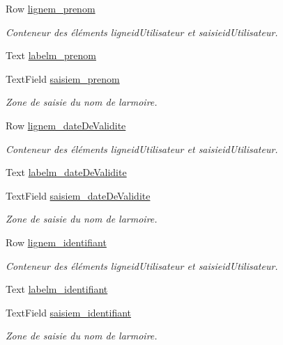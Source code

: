 \begin{DoxyCompactItemize}
Row \hyperlink{class_modification_utilisateur_a68a0801b7ac7ed932bb301a4649acb57}{lignem\+\_\+prenom}
\begin{DoxyCompactList}\small\item\em Conteneur des éléments ligneid\+Utilisateur et saisieid\+Utilisateur. \end{DoxyCompactList}\item 
Text \hyperlink{class_modification_utilisateur_a07c14435b6fc56bc5d724418d47ad8aa}{labelm\+\_\+prenom}
\item 
Text\+Field \hyperlink{class_modification_utilisateur_ae5fd8aa697fddc1b7c5a319d9ac78dfb}{saisiem\+\_\+prenom}
\begin{DoxyCompactList}\small\item\em Zone de saisie du nom de l\textquotesingle{}armoire. \end{DoxyCompactList}\item 
Row \hyperlink{class_modification_utilisateur_abbb480bff5baa6584137c48f1d8a8919}{lignem\+\_\+date\+De\+Validite}
\begin{DoxyCompactList}\small\item\em Conteneur des éléments ligneid\+Utilisateur et saisieid\+Utilisateur. \end{DoxyCompactList}\item 
Text \hyperlink{class_modification_utilisateur_a19c1b9dc4a51410f6176a4f12f75543a}{labelm\+\_\+date\+De\+Validite}
\item 
Text\+Field \hyperlink{class_modification_utilisateur_a733d56332e7d7575571c1eb4ca258e2d}{saisiem\+\_\+date\+De\+Validite}
\begin{DoxyCompactList}\small\item\em Zone de saisie du nom de l\textquotesingle{}armoire. \end{DoxyCompactList}\item 
Row \hyperlink{class_modification_utilisateur_a2917103526cb9f5d884993fb8c1d8b40}{lignem\+\_\+identifiant}
\begin{DoxyCompactList}\small\item\em Conteneur des éléments ligneid\+Utilisateur et saisieid\+Utilisateur. \end{DoxyCompactList}\item 
Text \hyperlink{class_modification_utilisateur_a8992cca86fa84fd4fc575dadd57f87dd}{labelm\+\_\+identifiant}
\item 
Text\+Field \hyperlink{class_modification_utilisateur_a99f61d359d892cc708a5960a5525e8a8}{saisiem\+\_\+identifiant}
\begin{DoxyCompactList}\small\item\em Zone de saisie du nom de l\textquotesingle{}armoire. \end{DoxyCompactList}\item 

\end{DoxyCompactItemize}
